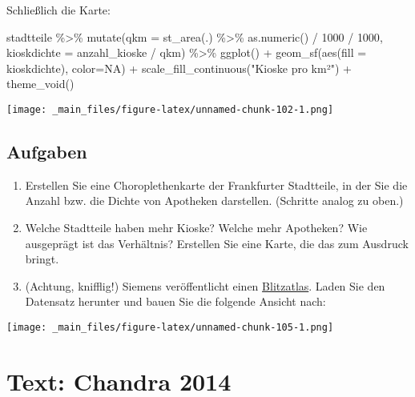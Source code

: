 \documentclass[
  ngerman,
]{article}
\newenvironment{Shaded}{\begin{snugshade}}{\end{snugshade}}
\newcommand{\AttributeTok}[1]{\textcolor[rgb]{0.77,0.63,0.00}{#1}}
\newcommand{\ConstantTok}[1]{\textcolor[rgb]{0.00,0.00,0.00}{#1}}
\newcommand{\DecValTok}[1]{\textcolor[rgb]{0.00,0.00,0.81}{#1}}
\newcommand{\FunctionTok}[1]{\textcolor[rgb]{0.00,0.00,0.00}{#1}}
\newcommand{\NormalTok}[1]{#1}
\newcommand{\SpecialCharTok}[1]{\textcolor[rgb]{0.00,0.00,0.00}{#1}}
\newcommand{\StringTok}[1]{\textcolor[rgb]{0.31,0.60,0.02}{#1}}
\begin{document}
Schließlich die Karte:

\begin{Shaded}
\begin{Highlighting}[]
\NormalTok{stadtteile }\SpecialCharTok{\%\textgreater{}\%}
  \FunctionTok{mutate}\NormalTok{(}\AttributeTok{qkm =} \FunctionTok{st\_area}\NormalTok{(.) }\SpecialCharTok{\%\textgreater{}\%} \FunctionTok{as.numeric}\NormalTok{() }\SpecialCharTok{/} \DecValTok{1000} \SpecialCharTok{/} \DecValTok{1000}\NormalTok{,}
         \AttributeTok{kioskdichte =}\NormalTok{ anzahl\_kioske }\SpecialCharTok{/}\NormalTok{ qkm) }\SpecialCharTok{\%\textgreater{}\%}
  \FunctionTok{ggplot}\NormalTok{() }\SpecialCharTok{+}
    \FunctionTok{geom\_sf}\NormalTok{(}\FunctionTok{aes}\NormalTok{(}\AttributeTok{fill =}\NormalTok{ kioskdichte), }\AttributeTok{color=}\ConstantTok{NA}\NormalTok{) }\SpecialCharTok{+}
    \FunctionTok{scale\_fill\_continuous}\NormalTok{(}\StringTok{"Kioske pro km²"}\NormalTok{) }\SpecialCharTok{+}
    \FunctionTok{theme\_void}\NormalTok{()}
\end{Highlighting}
\end{Shaded}

\texttt{[image: \_main\_files/figure-latex/unnamed-chunk-102-1.png]}

\hypertarget{aufgaben-4}{%
\subsection{Aufgaben}\label{aufgaben-4}}

\begin{enumerate}
\def\labelenumi{\arabic{enumi}.}
\item
  Erstellen Sie eine Choroplethenkarte der Frankfurter Stadtteile, in der Sie die Anzahl bzw. die Dichte von Apotheken darstellen. (Schritte analog zu oben.)
\item
  Welche Stadtteile haben mehr Kioske? Welche mehr Apotheken? Wie ausgeprägt ist das Verhältnis? Erstellen Sie eine Karte, die das zum Ausdruck bringt.
\item
  (Achtung, knifflig!) Siemens veröffentlicht einen \href{https://press.siemens.com/global/de/feature/wo-blitzt-es-am-haeufigsten}{Blitzatlas}. Laden Sie den Datensatz herunter und bauen Sie die folgende Ansicht nach:
\end{enumerate}

\texttt{[image: \_main\_files/figure-latex/unnamed-chunk-105-1.png]}

\hypertarget{text-chandra-2014}{%
\section{Text: Chandra 2014}\label{text-chandra-2014}}
\end{document}

